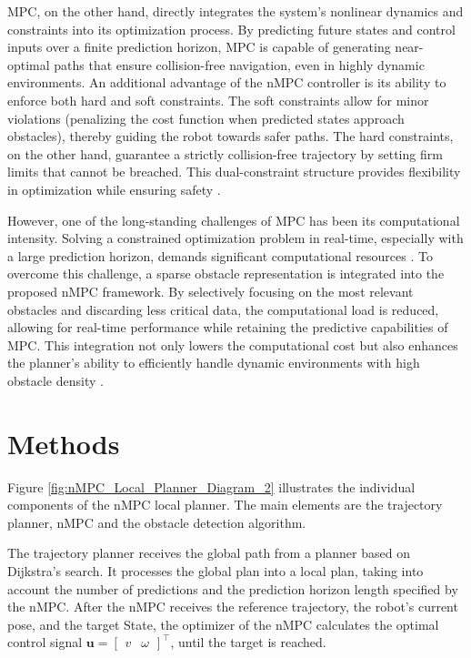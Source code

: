 \documentclass[conference]{IEEEtran}
\begin{document}
MPC, on the other hand, directly integrates the system’s nonlinear dynamics and constraints into its optimization process. By predicting future states and control inputs over a finite prediction horizon, MPC is capable of generating near-optimal paths that ensure collision-free navigation, even in highly dynamic environments. An additional advantage of the nMPC controller is its ability to enforce both hard and soft constraints. The soft constraints allow for minor violations (penalizing the cost function when predicted states approach obstacles), thereby guiding the robot towards safer paths. The hard constraints, on the other hand, guarantee a strictly collision-free trajectory by setting firm limits that cannot be breached. This dual-constraint structure provides flexibility in optimization while ensuring safety \cite{wan2024MultiUAVsNMPC}.

However, one of the long-standing challenges of MPC has been its computational intensity. Solving a constrained optimization problem in real-time, especially with a large prediction horizon, demands significant computational resources \cite{MPC_ROS, Model_predictive_Controller_for_Mobile_Robot}. To overcome this challenge, a sparse obstacle representation is integrated into the proposed nMPC framework. By selectively focusing on the most relevant obstacles and discarding less critical data, the computational load is reduced, allowing for real-time performance while retaining the predictive capabilities of MPC. This integration not only lowers the computational cost but also enhances the planner’s ability to efficiently handle dynamic environments with high obstacle density \cite{Lindqvist2020MPC}.

\section{Methods}

Figure \ref{fig:nMPC_Local_Planner_Diagram_2} illustrates the individual components of the nMPC local planner. The main elements are the trajectory planner, nMPC and the obstacle detection algorithm.

The trajectory planner receives the global path from a planner based on Dijkstra's search. It processes the global plan into a local plan, taking into account the number of predictions and the prediction horizon length specified by the nMPC. After the nMPC receives the reference trajectory, the robot’s current pose, and the target State, the optimizer of the nMPC calculates the optimal control signal \(\mathbf{u} = \begin{bmatrix} v & \omega \end{bmatrix}^\top\), until the target is reached.
\end{document}
